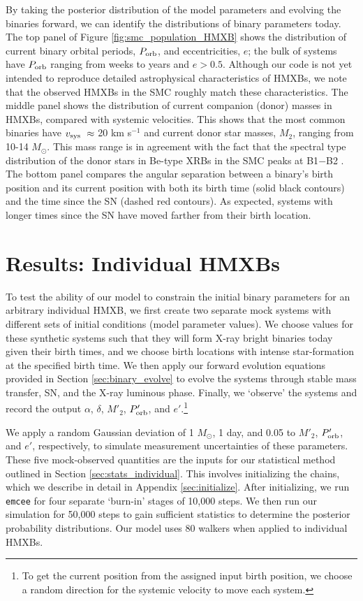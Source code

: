 \documentclass[usenatbib]{mnras}
\newcommand{\Msun}{\ifmmode {M_{\odot}}\else${M_{\odot}}$\fi}
\begin{document}
By taking the posterior distribution of the model parameters and evolving the binaries forward, we can identify the distributions of binary parameters today. The top panel of Figure \ref{fig:smc_population_HMXB} shows the distribution of current binary orbital periods, $P_{\rm orb}$, and eccentricities, $e$; the bulk of systems have $P_{\rm orb}$ ranging from weeks to years and $e>0.5$. Although our code is not yet intended to reproduce detailed astrophysical characteristics of HMXBs, we note that the observed HMXBs in the SMC roughly match these characteristics. The middle panel shows the distribution of current companion (donor) masses in HMXBs, compared with systemic velocities. This shows that the most common binaries have $v_{\rm sys}\ \approx$ 20 km s$^{-1}$ and current donor star masses, $M_2$, ranging from 10-14 \Msun. This mass range is in agreement with the fact that the spectral type distribution of the donor stars in Be-type XRBs in the SMC peaks at B1$-$B2 \citep{mcbride08,maravelias14}. The bottom panel compares the angular separation between a binary's birth position and its current position with both its birth time (solid black contours) and the time since the SN (dashed red contours). As expected, systems with longer times since the SN have moved farther from their birth location. 




\section{Results: Individual HMXBs} \label{sec:results_individual}


To test the ability of our model to constrain the initial binary parameters for an arbitrary individual HMXB, we first create two separate mock systems with different sets of initial conditions (model parameter values). We choose values for these synthetic systems such that they will form X-ray bright binaries today given their birth times, and we choose birth locations with intense star-formation at the specified birth time. We then apply our forward evolution equations provided in Section \ref{sec:binary_evolve} to evolve the systems through stable mass transfer, SN, and the X-ray luminous phase. Finally, we `observe' the systems and record the output $\alpha$, $\delta$, $M'_2$, $P'_{\rm orb}$, and $e'$.\footnote{To get the current position from the assigned input birth position, we choose a random direction for the systemic velocity to move each system.} 


We apply a random Gaussian deviation of 1 \Msun, 1 day, and 0.05 to $M'_2$, $P'_{\rm orb}$, and $e'$, respectively, to simulate measurement uncertainties of these parameters. These five mock-observed quantities are the inputs for our statistical method outlined in Section \ref{sec:stats_individual}. This involves initializing the chains, which we describe in detail in Appendix \ref{sec:initialize}. After initializing, we run {\tt emcee} for four separate `burn-in' stages of 10,000 steps. We then run our simulation for 50,000 steps to gain sufficient statistics to determine the posterior probability distributions. Our model uses 80 walkers when applied to individual HMXBs.
\end{document}

